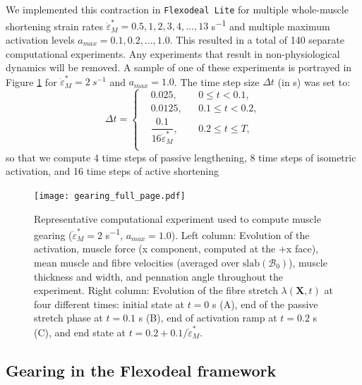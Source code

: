 \documentclass{sfuthesis}
\numberwithin{equation}{section}
\numberwithin{figure}{chapter}
\numberwithin{table}{chapter}
\theoremstyle{definition}
\def\*#1{{\mathbf{#1}}} %
\newcommand{\depsilon}{\dot{\varepsilon}}
\newcommand{\B}{\mathcal{B}}
\begin{document}
We implemented this contraction in \texttt{Flexodeal Lite} for multiple whole-muscle shortening strain rates $\depsilon_M^* = 0.5, 1, 2, 3, 4, \dots, 13$ \unit{s^{-1}} and multiple maximum activation levels $a_{max} = 0.1, 0.2, \dots, 1.0$. This resulted in a total of 140 separate computational experiments. Any experiments that result in non-physiological dynamics will be removed. A sample of one of these experiments is portrayed in Figure \ref{fig:traces_s2_a10} for $\depsilon_M^* = 2 \ \unit{s^{-1}}$ and $a_{max} = 1.0$. The time step size $\Delta t$ (in s) was set to:
\begin{equation}
    \Delta t = \left\{
        \begin{aligned}
            &0.025, &&0 \leq t < 0.1, \\
            &0.0125, &&0.1 \leq t < 0.2, \\
            &\dfrac{0.1}{16 \depsilon_M^*}, && 0.2 \leq t \leq T,\\
        \end{aligned}
    \right.
\end{equation}
so that we compute 4 time steps of passive lengthening, 8 time steps of isometric activation, and 16 time steps of active shortening

\begin{figure}
    \centering
    \texttt{[image: gearing\_full\_page.pdf]}
    \caption{Representative computational experiment used to compute muscle gearing ($\depsilon_M^* = 2$ \unit{s^{-1}}, $a_{max} = 1.0$). Left column: Evolution of the activation, muscle force (x component, computed at the +x face), mean muscle and fibre velocities (averaged over $\mathrm{slab}(\B_0)$), muscle thickness and width, and pennation angle throughout the experiment. Right column: Evolution of the fibre stretch $\lambda(\*X,t)$ at four different times: initial state at $t=0$ s (A), end of the passive stretch phase at $t=0.1$ s (B), end of activation ramp at $t = 0.2$ s (C), and end state at $t=0.2 + 0.1/\depsilon_M^*$. \label{fig:traces_s2_a10}}
\end{figure}

\subsection{Gearing in the Flexodeal framework} \label{sec:gearing_in_the_flexodeal_framework}
\end{document}

